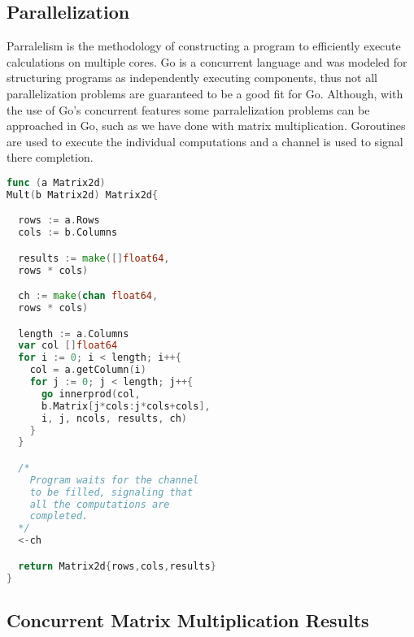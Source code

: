 \subsection{Parallelization}
Parralelism is the methodology of constructing a program to efficiently execute calculations on multiple cores. Go is a concurrent language and was modeled for structuring programs as independently executing components, thus not all parallelization problems are guaranteed to be a good fit for Go. Although, with the use of Go's concurrent features some parralelization problems can be approached in Go, such as we have done with matrix multiplication. Goroutines are used to execute the individual computations and a channel is used to signal there completion. \cite{website:go-lang-documentation}
\begin{lstlisting}[language=Go]
func (a Matrix2d) 
Mult(b Matrix2d) Matrix2d{

  rows := a.Rows
  cols := b.Columns

  results := make([]float64,
  rows * cols)

  ch := make(chan float64,
  rows * cols)

  length := a.Columns
  var col []float64
  for i := 0; i < length; i++{
    col = a.getColumn(i)
    for j := 0; j < length; j++{
      go innerprod(col,
      b.Matrix[j*cols:j*cols+cols],
      i, j, ncols, results, ch)
    }
  }

  /*
    Program waits for the channel
    to be filled, signaling that
    all the computations are
    completed.
  */
  <-ch

  return Matrix2d{rows,cols,results}
}
\end{lstlisting}
\subsection{Concurrent Matrix Multiplication Results}

